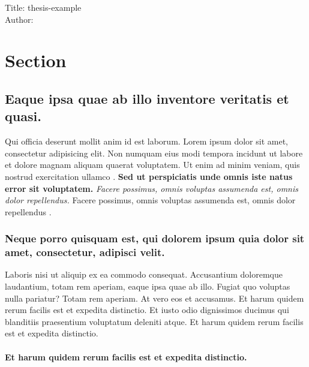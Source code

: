 \documentclass[
]{report}
\date{}
\let\oldparagraph\paragraph
\renewcommand{\paragraph}[1]{\oldparagraph{#1}\mbox{}}
\begin{document}
Title: thesis-example\\
Author:

\label{chapter-1}

\hypertarget{section-1.1}{%
\section{Section}\label{section-1.1}}

\hypertarget{eaque-ipsa-quae-ab-illo-inventore-veritatis-et-quasi.}{%
\subsection{Eaque ipsa quae ab illo inventore veritatis et
quasi.}\label{eaque-ipsa-quae-ab-illo-inventore-veritatis-et-quasi.}}

Qui officia deserunt mollit anim id est laborum. Lorem ipsum dolor sit
amet, consectetur adipisicing elit. Non numquam eius modi tempora
incidunt ut labore et dolore magnam aliquam quaerat voluptatem. Ut enim
ad minim veniam, quis nostrud exercitation ullamco
\citep{Zongkerchicken2005}. \textbf{Sed ut perspiciatis unde omnis iste
natus error sit voluptatem.} \emph{Facere possimus, omnis voluptas
assumenda est, omnis dolor repellendus.} Facere possimus, omnis voluptas
assumenda est, omnis dolor repellendus \citep{upper1974unsuccessful}.



\hypertarget{neque-porro-quisquam-est-qui-dolorem-ipsum-quia-dolor-sit-amet-consectetur-adipisci-velit.}{%
\subsubsection{Neque porro quisquam est, qui dolorem ipsum quia dolor
sit amet, consectetur, adipisci
velit.}\label{neque-porro-quisquam-est-qui-dolorem-ipsum-quia-dolor-sit-amet-consectetur-adipisci-velit.}}

Laboris nisi ut aliquip ex ea commodo consequat. Accusantium doloremque
laudantium, totam rem aperiam, eaque ipsa quae ab illo. Fugiat quo
voluptas nulla pariatur? Totam rem aperiam. At vero eos et accusamus. Et
harum quidem rerum facilis est et expedita distinctio. Et iusto odio
dignissimos ducimus qui blanditiis praesentium voluptatum deleniti
atque. Et harum quidem rerum facilis est et expedita distinctio.

\hypertarget{et-harum-quidem-rerum-facilis-est-et-expedita-distinctio.}{%
\paragraph{\texorpdfstring{Et harum quidem rerum facilis est et expedita
distinctio.\newline}{Et harum quidem rerum facilis est et expedita distinctio.}}\label{et-harum-quidem-rerum-facilis-est-et-expedita-distinctio.}}
\end{document}
